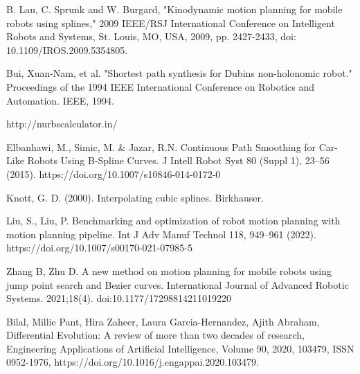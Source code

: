 \begin{thebibliography}{9}
B. Lau, C. Sprunk and W. Burgard, "Kinodynamic motion planning for mobile robots using splines," 
2009 IEEE/RSJ International Conference on Intelligent Robots and Systems, St. Louis, MO, USA, 2009, 
pp. 2427-2433, doi: 10.1109/IROS.2009.5354805. 

Bui, Xuan-Nam, et al. "Shortest path synthesis for Dubins non-holonomic robot." Proceedings of the 1994 
IEEE International Conference on Robotics and Automation. IEEE, 1994.

http://nurbscalculator.in/

Elbanhawi, M., Simic, M. \& Jazar, R.N. Continuous Path Smoothing for Car-Like Robots Using B-Spline 
Curves. J Intell Robot Syst 80 (Suppl 1), 23–56 (2015). https://doi.org/10.1007/s10846-014-0172-0

Knott, G. D. (2000). Interpolating cubic splines. Birkhauser. 

Liu, S., Liu, P. Benchmarking and optimization of robot motion planning with motion planning 
pipeline. Int J Adv Manuf Technol 118, 949–961 (2022). https://doi.org/10.1007/s00170-021-07985-5


Zhang B, Zhu D. A new method on motion planning for mobile robots using jump point search and 
Bezier curves. International Journal of Advanced Robotic Systems. 2021;18(4). doi:10.1177/17298814211019220

Bilal, Millie Pant, Hira Zaheer, Laura Garcia-Hernandez, Ajith Abraham,
Differential Evolution: A review of more than two decades of research,
Engineering Applications of Artificial Intelligence,
Volume 90,
2020,
103479,
ISSN 0952-1976,
https://doi.org/10.1016/j.engappai.2020.103479.


\end{thebibliography}



